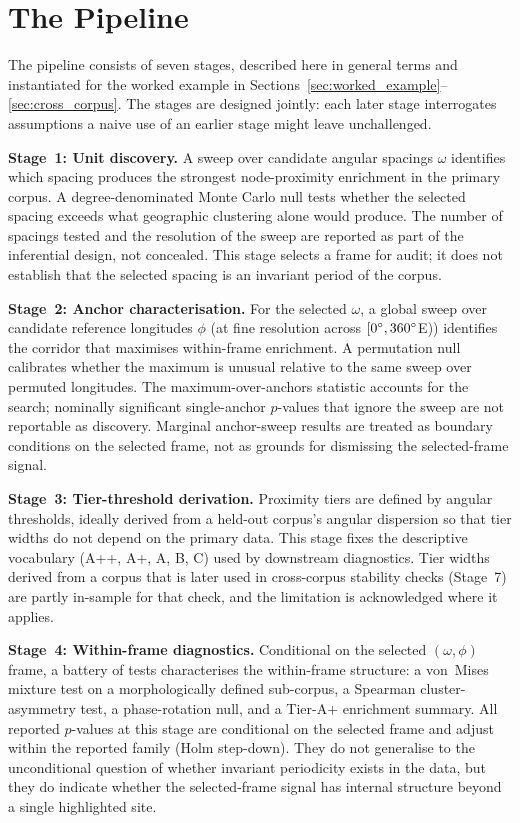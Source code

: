 \documentclass[12pt,a4paper]{article}
\newcommand{\degr}{\ifmmode{^\circ}\else\textdegree{}\fi}
\begin{document}
\section{The Pipeline}
\label{sec:pipeline}

The pipeline consists of seven stages, described here in general terms
and instantiated for the worked example in
Sections~\ref{sec:worked_example}--\ref{sec:cross_corpus}. The stages
are designed jointly: each later stage interrogates assumptions a
naive use of an earlier stage might leave unchallenged.

\textbf{Stage~1: Unit discovery.} A sweep over candidate angular
spacings $\omega$ identifies which spacing produces the strongest
node-proximity enrichment in the primary corpus. A degree-denominated
Monte Carlo null tests whether the selected spacing exceeds what
geographic clustering alone would produce. The number of spacings
tested and the resolution of the sweep are reported as part of the
inferential design, not concealed. This stage selects a frame for
audit; it does not establish that the selected spacing is an invariant
period of the corpus.

\textbf{Stage~2: Anchor characterisation.} For the selected $\omega$,
a global sweep over candidate reference longitudes $\phi$ (at fine
resolution across $[0\degr, 360\degr$E)) identifies the corridor that
maximises within-frame enrichment. A permutation null calibrates
whether the maximum is unusual relative to the same sweep over
permuted longitudes. The maximum-over-anchors statistic accounts for
the search; nominally significant single-anchor $p$-values that ignore
the sweep are not reportable as discovery. Marginal anchor-sweep
results are treated as boundary conditions on the selected frame, not
as grounds for dismissing the selected-frame signal.

\textbf{Stage~3: Tier-threshold derivation.} Proximity tiers are
defined by angular thresholds, ideally derived from a held-out
corpus's angular dispersion so that tier widths do not depend on the
primary data. This stage fixes the descriptive vocabulary (A++, A+,
A, B, C) used by downstream diagnostics. Tier widths derived from a
corpus that is later used in cross-corpus stability checks
(Stage~7) are partly in-sample for that check, and the limitation is
acknowledged where it applies.

\textbf{Stage~4: Within-frame diagnostics.} Conditional on the selected
$(\omega, \phi)$ frame, a battery of tests characterises the
within-frame structure: a von~Mises mixture test on a morphologically
defined sub-corpus, a Spearman cluster-asymmetry test, a phase-rotation
null, and a Tier-A+ enrichment summary. All reported $p$-values at this
stage are conditional on the selected frame and adjust within the
reported family (Holm step-down). They do not generalise to the
unconditional question of whether invariant periodicity exists in the
data, but they do indicate whether the selected-frame signal has
internal structure beyond a single highlighted site.
\end{document}
